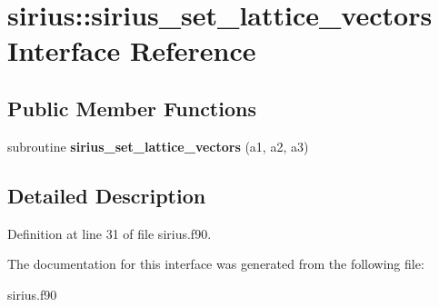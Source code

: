 \hypertarget{interfacesirius_1_1sirius__set__lattice__vectors}{}\section{sirius\+:\+:sirius\+\_\+set\+\_\+lattice\+\_\+vectors Interface Reference}
\label{interfacesirius_1_1sirius__set__lattice__vectors}
\subsection*{Public Member Functions}
\begin{DoxyCompactItemize}
\item 
\hypertarget{interfacesirius_1_1sirius__set__lattice__vectors_a012a8cb854181506a7315b5229bac5dd}{}subroutine {\bfseries sirius\+\_\+set\+\_\+lattice\+\_\+vectors} (a1, a2, a3)\label{interfacesirius_1_1sirius__set__lattice__vectors_a012a8cb854181506a7315b5229bac5dd}

\end{DoxyCompactItemize}


\subsection{Detailed Description}


Definition at line 31 of file sirius.\+f90.



The documentation for this interface was generated from the following file\+:\begin{DoxyCompactItemize}
\item 
sirius.\+f90\end{DoxyCompactItemize}
